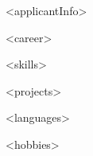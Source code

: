 \documentclass[12pt]{article}
\begin{document}

    \begin{center}
    {
        \small\bodyfont
        <applicantInfo>
    }
    \end{center}


    \setlength{\parskip}{\baselineskip}
    \setlength{\parindent}{2pt}

<career>

<skills>

<projects>

<languages>

<hobbies>
\end{document}
